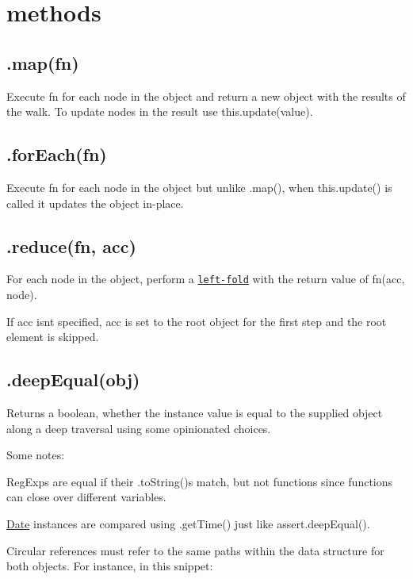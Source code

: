 \section*{methods }

\subsection*{.map(fn) }

Execute {\ttfamily fn} for each node in the object and return a new object with the results of the walk. To update nodes in the result use {\ttfamily this.\+update(value)}.

\subsection*{.for\+Each(fn) }

Execute {\ttfamily fn} for each node in the object but unlike {\ttfamily .map()}, when {\ttfamily this.\+update()} is called it updates the object in-\/place.

\subsection*{.reduce(fn, acc) }

For each node in the object, perform a \href{http://en.wikipedia.org/wiki/Fold_(higher-order_function)}{\tt left-\/fold} with the return value of {\ttfamily fn(acc, node)}.

If {\ttfamily acc} isn\textquotesingle{}t specified, {\ttfamily acc} is set to the root object for the first step and the root element is skipped.

\subsection*{.deep\+Equal(obj) }

Returns a boolean, whether the instance value is equal to the supplied object along a deep traversal using some opinionated choices.

Some notes\+:


\begin{DoxyItemize}
\item Reg\+Exps are equal if their .to\+String()s match, but not functions since functions can close over different variables.
\item \mbox{\hyperlink{classDate}{Date}} instances are compared using {\ttfamily .get\+Time()} just like {\ttfamily assert.\+deep\+Equal()}.
\item Circular references must refer to the same paths within the data structure for both objects. For instance, in this snippet\+:
\end{DoxyItemize}


